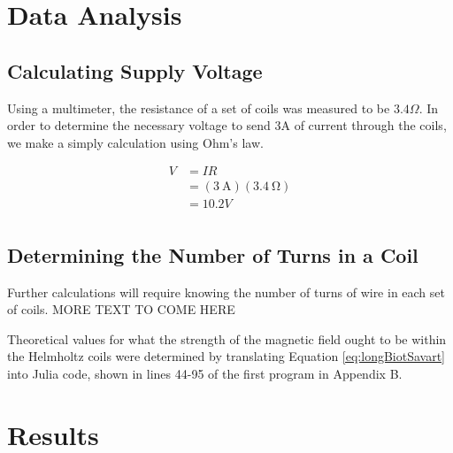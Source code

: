 \documentclass[a4paper]{article}
\begin{document}
\section{Data Analysis}


\subsection{Calculating Supply Voltage}

\qq Using a multimeter, the resistance of a set of coils was measured to be
$3.4 \Omega$. In order to determine the necessary voltage to send 3A of current
through the coils, we make a simply calculation using Ohm's law.

\begin{align*}
V &= IR \\
  &= (\SI{3}{\ampere})(\SI{3.4}{\ohm}) \\
  &= 10.2V \\
\end{align*}

\subsection{Determining the Number of Turns in a Coil}

\qq Further calculations will require knowing the number of turns of wire in each
set of coils. MORE TEXT TO COME HERE

\qq Theoretical values for what the strength of the magnetic field ought to be
within the Helmholtz coils were determined by translating Equation
\ref{eq:longBiotSavart} into Julia code, shown in lines 44-95 of the first
program in Appendix B. 








\section{Results}
\end{document}
